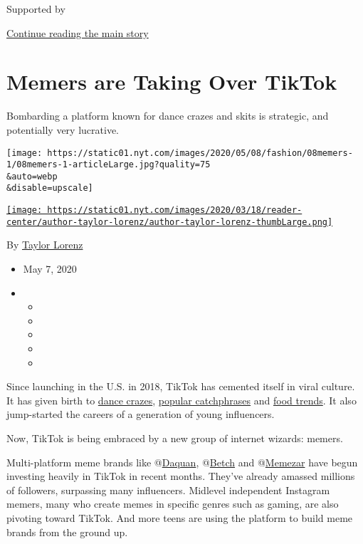Supported by

\protect\hyperlink{after-sponsor}{Continue reading the main story}

\hypertarget{memers-are-taking-over-tiktok}{%
\section{Memers are Taking Over
TikTok}\label{memers-are-taking-over-tiktok}}

Bombarding a platform known for dance crazes and skits is strategic, and
potentially very lucrative.

\texttt{[image: https://static01.nyt.com/images/2020/05/08/fashion/08memers-1/08memers-1-articleLarge.jpg?quality=75\\\&auto=webp\\\&disable=upscale]}

\href{https://www.nytimes.com/by/taylor-lorenz}{\texttt{[image: https://static01.nyt.com/images/2020/03/18/reader-center/author-taylor-lorenz/author-taylor-lorenz-thumbLarge.png]}}

By \href{https://www.nytimes.com/by/taylor-lorenz}{Taylor Lorenz}

\begin{itemize}
\item
  May 7, 2020
\item
  \begin{itemize}
  \item
  \item
  \item
  \item
  \item
  \end{itemize}
\end{itemize}

Since launching in the U.S. in 2018, TikTok has cemented itself in viral
culture. It has given birth to
\href{https://slack-redir.net/link?url=https\%3A\%2F\%2Fwww.nytimes.com\%2F2020\%2F02\%2F13\%2Fstyle\%2Fthe-original-renegade.html}{dance
crazes},
\href{https://slack-redir.net/link?url=https\%3A\%2F\%2Fwww.nytimes.com\%2F2019\%2F10\%2F29\%2Fstyle\%2Fok-boomer.html}{popular
catchphrases} and
\href{https://slack-redir.net/link?url=https\%3A\%2F\%2Fwww.vox.com\%2Fthe-goods\%2F2020\%2F5\%2F5\%2F21246914\%2Fpancake-cereal-tiktok}{food
trends}. It also jump-started the careers of a generation of young
influencers.

Now, TikTok is being embraced by a new group of internet wizards:
memers.

Multi-platform meme brands like
@\href{https://www.tiktok.com/@daquan}{Daquan},
@\href{https://www.tiktok.com/@betch?}{Betch} and
@\href{https://www.tiktok.com/@memezar}{Memezar} have begun investing
heavily in TikTok in recent months. They've already amassed millions of
followers, surpassing many influencers. Midlevel independent Instagram
memers, many who create memes in specific genres such as gaming, are
also pivoting toward TikTok. And more teens are using the platform to
build meme brands from the ground up.

